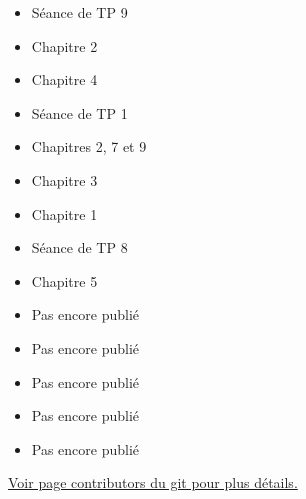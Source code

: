   \begin{itemize}
    \item Séance de TP 9
  \end{itemize}
  \begin{itemize}
    \item Chapitre 2
  \end{itemize}
  \begin{itemize}
    \item Chapitre 4
  \end{itemize}
  \begin{itemize}
    \item Séance de TP 1
  \end{itemize}
  \begin{itemize}
    \item Chapitres 2, 7 et 9
  \end{itemize}
  \begin{itemize}
    \item Chapitre 3
  \end{itemize}
  \begin{itemize}
    \item Chapitre 1
  \end{itemize}
  \begin{itemize}
    \item Séance de TP 8
  \end{itemize}
  \begin{itemize}
    \item Chapitre 5
  \end{itemize}
  \begin{itemize}
    \item Pas encore publié
  \end{itemize}
  \begin{itemize}
    \item Pas encore publié
  \end{itemize}
  \begin{itemize}
    \item Pas encore publié
  \end{itemize}
  \begin{itemize}
    \item Pas encore publié
  \end{itemize}
  \begin{itemize}
    \item Pas encore publié\\
  \end{itemize}
\href{https://github.com/blegat/LINMA1691/graphs/contributors}{Voir page contributors du git pour plus détails.}

\clearpage
\printindex


